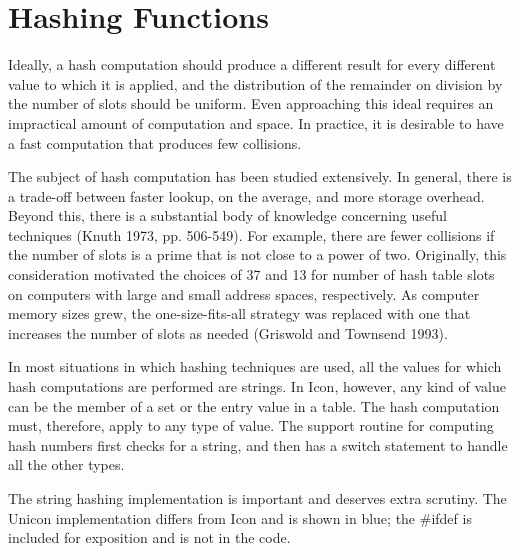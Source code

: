 \section{Hashing Functions}

Ideally, a hash computation should produce a different result for
every different value to which it is applied, and the distribution of
the remainder on division by the number of slots should be
uniform. Even approaching this ideal requires an impractical amount of
computation and space. In practice, it is desirable to have a fast
computation that produces few collisions.

The subject of hash computation has been studied extensively.  In
general, there is a trade-off between faster lookup, on the average,
and more storage overhead. Beyond this, there is a substantial body of
knowledge concerning useful techniques (Knuth 1973, pp. 506-549). For
example, there are fewer collisions if the number of slots is a prime
that is not close to a power of two. Originally, this consideration
motivated the choices of 37 and 13 for number of hash table slots on
computers with large and small address spaces, respectively. As
computer memory sizes grew, the one-size-fits-all strategy was
replaced with one that increases the number of slots as needed
(Griswold and Townsend 1993).

In most situations in which hashing techniques are used, all the
values for which hash computations are performed are strings. In Icon,
however, any kind of value can be the member of a set or the entry
value in a table. The hash computation must, therefore, apply to any
type of value. The support routine for computing hash numbers first
checks for a string, and then has a switch statement to handle all
the other types.

The string hashing implementation is important and deserves extra
scrutiny. The Unicon implementation differs from Icon and is shown
in blue; the \#ifdef is included for exposition and is not in the code.

